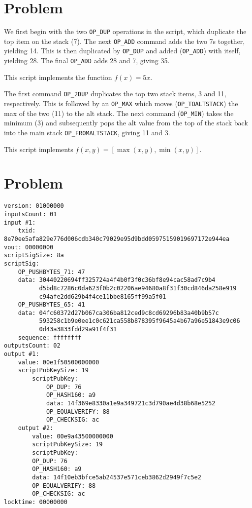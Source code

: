 \documentclass[11pt]{article}
\begin{document}
\section{Problem}

\begin{p}\end{p}
We first begin with the two \texttt{OP\_DUP} operations in the script, which duplicate the top item on the stack (7). The next \texttt{OP\_ADD} command adds the two 7s together, yielding 14. This is then duplicated by \texttt{OP\_DUP} and added (\texttt{OP\_ADD}) with itself, yielding 28. The final \texttt{OP\_ADD} adds 28 and 7, giving 35.

This script implements the function $f(x) = 5x$.

\begin{p}\end{p}
The first command \texttt{OP\_2DUP} duplicates the top two stack items, 3 and 11, respectively. This is followed by an \texttt{OP\_MAX} which moves (\texttt{OP\_TOALTSTACK}) the max of the two (11) to the alt stack. The next command (\texttt{OP\_MIN}) takes the minimum (3) and subsequently pops the alt value from the top of the stack back into the main stack \texttt{OP\_FROMALTSTACK}, giving 11 and 3.

This script implements $f(x, y) = [\max(x, y), \min(x, y)]$.

\section{Problem}

\begin{verbatim}
version: 01000000
inputsCount: 01
input #1:
    txid: 8e70ee5afa829e776d006cdb340c79029e95d9bdd05975159019697172e944ea
vout: 00000000
scriptSigSize: 8a
scriptSig:
    OP_PUSHBYTES_71: 47
    data: 30440220694ff325724a4f4b0f3f0c36bf8e94cac58ad7c9b4
          d5bd8c7286c0da623f0b2c02206ae94680a8f31f30cd846da258e919
          c94afe2dd629b4f4ce11bbe8165ff99a5f01
    OP_PUSHBYTES_65: 41
    data: 04fc60372d27b067ca306ba812ced9c8cd69296b83a40b9b57c
          593258c1b9e0ee1c0c621ca558b878395f9645a4b67a96e51843e9c06
          0d43a3833fdd29a91f4f31
    sequence: ffffffff
outputsCount: 02
output #1:
    value: 00e1f50500000000
    scriptPubKeySize: 19
        scriptPubKey:
            OP_DUP: 76
            OP_HASH160: a9
            data: 14f369e8330a1e9a349721c3d790ae4d38b68e5252
            OP_EQUALVERIFY: 88
            OP_CHECKSIG: ac
    output #2:
        value: 00e9a43500000000
        scriptPubKeySize: 19
        scriptPubKey:
        OP_DUP: 76
        OP_HASH160: a9
        data: 14f10eb3bfce5ab24537e571ceb3862d2949f7c5e2
        OP_EQUALVERIFY: 88
        OP_CHECKSIG: ac
locktime: 00000000
\end{verbatim}
\end{document}
